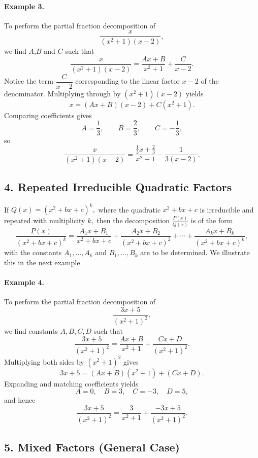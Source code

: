 \paragraph{Example 3.} To perform the partial fraction decomposition of
\[
\frac{x}{(x^2+1)(x-2)},
\]
we find $A$,$B$ and $C$ such that 
\[\frac{x}{(x^2+1)(x-2)}= \frac{Ax+B}{x^2+1} + \frac{C}{x-2}.\] Notice the term \(\dfrac{C}{x-2}\) corresponding to the linear factor $x-2$ of the denominator.
Multiplying through by $(x^2+1)(x-2)$ yields
\[
x = (Ax+B)(x-2) + C(x^2+1).
\] 
Comparing coefficients gives
\[
A = \dfrac13, \qquad B = \dfrac23, \qquad C = -\dfrac13,
\]
so
\[
\frac{x}{(x^2+1)(x-2)}
= \frac{\tfrac13 x + \tfrac23}{x^2+1} - \frac{1}{3(x-2)}.
\]

\bigskip

\subsection*{4. Repeated Irreducible Quadratic Factors}

If \(Q(x) = (x^2+bx+c)^k,\) where the quadratic $x^2+bx+c$ is irreducible and repeated with multiplicity $k,$  
then the decomposition \(\displaystyle\frac{P(x)}{Q(x)}\)  is of the form
\[
\frac{P(x)}{(x^2+bx+c)^k}
= \frac{A_1x+B_1}{x^2+bx+c}
+ \frac{A_2x+B_2}{(x^2+bx+c)^2}
+ \cdots +
\frac{A_kx+B_k}{(x^2+bx+c)^k},
\]
with the constants $A_1, \dots, A_k$ and $B_1, \dots, B_k$ are to be determined. We illustrate this in the next example.

\paragraph{Example 4.} To perform the partial fraction decomposition of 
\[
\frac{3x+5}{(x^2+1)^2},
\]
we find constants $A, B, C, D$ such that 
\[\frac{3x+5}{(x^2+1)^2}= \frac{Ax+B}{x^2+1} + \frac{Cx+D}{(x^2+1)^2}.\]
Multiplying both sides by $(x^2+1)^2$ gives
\[
3x+5 = (Ax+B)(x^2+1) + (Cx+D).
\]
Expanding and matching coefficients yields
\[
A=0,\quad B=3,\quad C=-3,\quad D=5,
\]
and hence
\[
\frac{3x+5}{(x^2+1)^2}
= \frac{3}{x^2+1} + \frac{-3x+5}{(x^2+1)^2}.
\]

\bigskip

\subsection*{5. Mixed Factors (General Case)}

